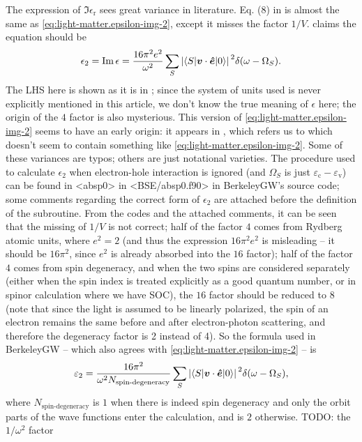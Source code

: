 \documentclass[hyperref, a4paper, 12pt]{report}
\def\texttt#1{<#1>}%
\newcommand{\shortcode}[1]{\texttt{#1}}
\newcommand*{\epsr}{\epsilon_{\text{r}}}
\begin{document}
The expression of $\Im \epsr$ sees great variance in literature. 
Eq. (8) in \cite{del1993optical} is almost the same as \eqref{eq:light-matter.epsilon-img-2},
except it misses the factor $1 / V$. 
\cite{berkeleygw} claims the equation should be 
\[
    \epsilon_2 = \Im \epsilon = \frac{16 \pi^2 e^2}{\omega^2 } 
    \sum_S \abs*{\mel**{S}{\vb*{v} \cdot \vu*{e}}{0}}^2 \delta(\omega - \Omega_S).
\]
The LHS here is shown as it is in \cite{berkeleygw}; 
since the system of units used is never explicitly mentioned in this article, 
we don't know the true meaning of $\epsilon$ here;
the origin of the $4$ factor is also mysterious.
This version of \eqref{eq:light-matter.epsilon-img-2} seems to have an early origin:
it appears in \cite{rohlfing2000electron},
which refers us to \cite{adolph1996nonlocality}
which doesn't seem to contain something like \eqref{eq:light-matter.epsilon-img-2}.
Some of these variances are typos; 
others are just notational varieties. 
The procedure used to calculate $\epsilon_2$
when electron-hole interaction is ignored 
(and $\Omega_S$ is just $\varepsilon_{\text{c}} - \varepsilon_{\text{v}}$) 
can be found in 
\shortcode{absp0} in \shortcode{BSE/absp0.f90} in BerkeleyGW's source code;
some comments regarding the correct form of $\epsilon_2$
are attached before the definition of the subroutine.
From the codes and the attached comments, 
it can be seen that 
the missing of $1/V$ is not correct;
half of the factor $4$ comes from Rydberg atomic units, 
where $e^2 = 2$
(and thus the expression $16 \pi^2 e^2$ is misleading -- 
it should be $16 \pi^2$, 
since $e^2$ is already absorbed into the $16$ factor);
half of the factor $4$ comes from spin degeneracy,
and when the two spins are considered separately 
(either when the spin index is treated explicitly as a good quantum number, 
or in spinor calculation where we have SOC),
the $16$ factor should be reduced to $8$
(note that since the light is assumed to be linearly polarized, 
the spin of an electron remains the same 
before and after electron-photon scattering, 
and therefore the degeneracy factor is 2 instead of 4). 
So the formula used in BerkeleyGW 
-- which also agrees with \eqref{eq:light-matter.epsilon-img-2} -- 
is 
\begin{equation}
    \varepsilon_2 = \frac{16 \pi^2}{\omega^2 N_{\text{spin-degeneracy}}} 
    \sum_S \abs*{\mel**{S}{\vb*{v} \cdot \vu*{e}}{0}}^2 \delta(\omega - \Omega_S),
\end{equation}
where $N_{\text{spin-degeneracy}}$ is $1$ 
when there is indeed spin degeneracy and only the orbit parts
of the wave functions enter the calculation, 
and is $2$ otherwise. 
TODO: the $1 / \omega^2$ factor
\end{document}

